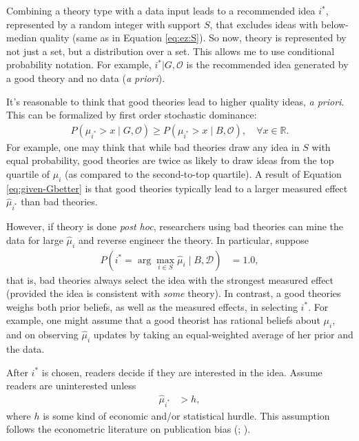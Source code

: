 \documentclass[12pt,english]{article}
\theoremstyle{plain}
\theoremstyle{plain}
\begin{document}
Combining a theory type with a data input leads to a recommended idea $i^{\ast}$, represented by a random integer with support $S$, that excludes ideas with below-median quality (same as in Equation \eqref{eq:ez:S}). So now, theory is represented by not just a set, but a distribution over a set. This allows me to use conditional probability notation. For example, $i^{\ast}|G,\mathcal{O}$ is the recommended idea generated by a good theory and no data (\emph{a priori}).

It's reasonable to think that good theories lead to higher quality ideas, \emph{a priori}. This can be formalized by first order stochastic dominance:
\begin{align}
P\left(\mu_{i^{\ast}}>x\mid G,\mathcal{O}\right)
\geq
P\left(\mu_{i^{\ast}}>x\mid B,\mathcal{O}\right),
\quad \forall x\in \mathbb{R}.
\label{eq:given-Gbetter}
\end{align}
For example, one may think that while bad theories draw any idea in $S$ with equal probability, good theories are twice as likely to draw ideas from the top quartile of $\mu_{i}$ (as compared to the second-to-top quartile). A result of Equation \eqref{eq:given-Gbetter} is that  good theories typically lead to a larger measured effect $\hat{\mu}_{i^{\ast}}$
than bad theories.

However, if theory is done \emph{post hoc}, researchers using bad theories can mine the data for large $\hat{\mu}_{i}$ and reverse engineer the theory. In particular, suppose 
\begin{align}
P\left(i^{\ast}=\arg\max_{i\in S }\hat{\mu}_{i}\mid B,\mathcal{D}\right) & =1.0,
\label{eq:endo:bad-post-hoc}
\end{align}
that is, bad theories always select the idea with the strongest measured effect (provided the idea is consistent with \emph{some} theory).  In contrast, a good theories weighs both prior beliefs, as well as the measured effects, in selecting $i^{\ast}$.  For example, one might assume that a good theorist has rational beliefs about $\mu_{i}$, and on observing $\hat{\mu}_{i}$ updates by taking an equal-weighted average of her prior and the data. 


After $i^{\ast}$ is chosen, readers decide if they are interested in the idea. Assume readers are uninterested unless 
\begin{align}
\hat{\mu}_{i^{\ast}} & >h,
\end{align}
where $h$ is some kind of economic and/or statistical hurdle. This assumption follows the econometric literature on publication bias (\citet{andrews2019identification}; \citet{chen2020publication}).
\end{document}
